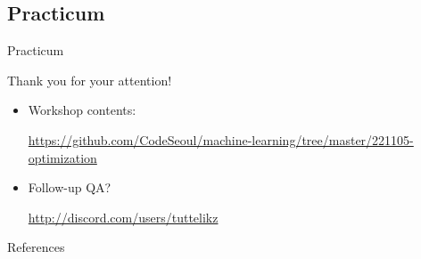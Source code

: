     \subsection{Practicum}
    \begin{frame}{Practicum}
      \begin{center}
      \begin{huge}Thank you for your attention!\end{huge}
      \end{center}

        \vspace{0.5cm}
        \begin{itemize}
          \item Workshop contents: \\
            \begin{small}\url{https://github.com/CodeSeoul/machine-learning/tree/master/221105-optimization}
            \end{small}
          \item Follow-up QA? \\ 
            \begin{small}\url{http://discord.com/users/tuttelikz}
            \end{small}
        \end{itemize}

    \end{frame}

    \begin{frame}{References}
      \printbibliography  
    \end{frame}




